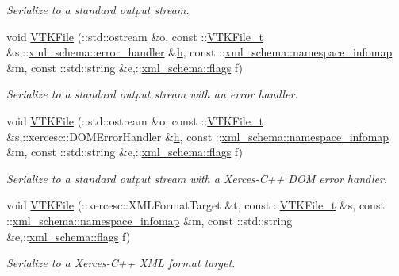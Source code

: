 \begin{DoxyCompactItemize}
\begin{DoxyCompactList}\small\item\em Serialize to a standard output stream. \end{DoxyCompactList}\item 
void \hyperlink{vtk-unstructured_8cpp_abe499904eca404dadf8429281c88a3a2}{V\-T\-K\-File} (\-::std\-::ostream \&o, const \-::\hyperlink{classVTKFile__t}{V\-T\-K\-File\-\_\-t} \&s,\-::\hyperlink{namespacexml__schema_a0a5d9528e9175cedf199984a8bb64d62}{xml\-\_\-schema\-::error\-\_\-handler} \&\hyperlink{MolSim_8cpp_aa6e8e201edf24007dc075bfef6e8210c}{h}, const \-::\hyperlink{namespacexml__schema_ad52b6e3505153cb30ba3452f7868450e}{xml\-\_\-schema\-::namespace\-\_\-infomap} \&m, const \-::std\-::string \&e,\-::\hyperlink{namespacexml__schema_a0612287d030cb2732d31a45b258fdc87}{xml\-\_\-schema\-::flags} f)
\begin{DoxyCompactList}\small\item\em Serialize to a standard output stream with an error handler. \end{DoxyCompactList}\item 
void \hyperlink{vtk-unstructured_8cpp_af6a299b24ebe8c1465bc6164376a10bc}{V\-T\-K\-File} (\-::std\-::ostream \&o, const \-::\hyperlink{classVTKFile__t}{V\-T\-K\-File\-\_\-t} \&s,\-::xercesc\-::\-D\-O\-M\-Error\-Handler \&\hyperlink{MolSim_8cpp_aa6e8e201edf24007dc075bfef6e8210c}{h}, const \-::\hyperlink{namespacexml__schema_ad52b6e3505153cb30ba3452f7868450e}{xml\-\_\-schema\-::namespace\-\_\-infomap} \&m, const \-::std\-::string \&e,\-::\hyperlink{namespacexml__schema_a0612287d030cb2732d31a45b258fdc87}{xml\-\_\-schema\-::flags} f)
\begin{DoxyCompactList}\small\item\em Serialize to a standard output stream with a Xerces-\/\-C++ D\-O\-M error handler. \end{DoxyCompactList}\item 
void \hyperlink{vtk-unstructured_8cpp_aa29105a5170680695be352fa0e00341d}{V\-T\-K\-File} (\-::xercesc\-::\-X\-M\-L\-Format\-Target \&t, const \-::\hyperlink{classVTKFile__t}{V\-T\-K\-File\-\_\-t} \&s, const \-::\hyperlink{namespacexml__schema_ad52b6e3505153cb30ba3452f7868450e}{xml\-\_\-schema\-::namespace\-\_\-infomap} \&m, const \-::std\-::string \&e,\-::\hyperlink{namespacexml__schema_a0612287d030cb2732d31a45b258fdc87}{xml\-\_\-schema\-::flags} f)
\begin{DoxyCompactList}\small\item\em Serialize to a Xerces-\/\-C++ X\-M\-L format target. \end{DoxyCompactList}\item 

\end{DoxyCompactItemize}
